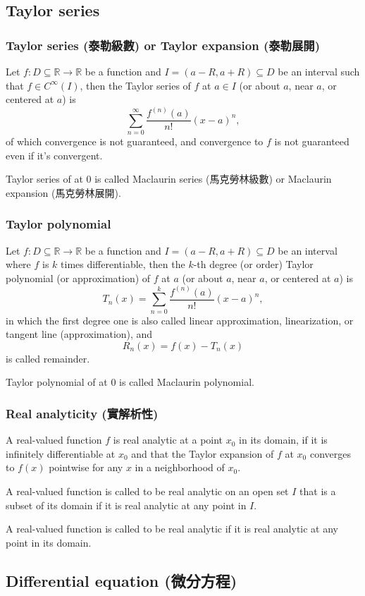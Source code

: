 \documentclass[a4paper,12pt]{report}
\begin{document}
\begin{itemize}
\begin{itemize}
\subsection{Taylor series}
\subsubsection{Taylor series (泰勒級數) or Taylor expansion (泰勒展開)}
Let $f\colon D\subseteq\mathbb{R}\to\mathbb{R}$ be a function and $I=(a-R,a+R)\subseteq D$ be an interval such that $f\in C^{\infty}(I)$, then the Taylor series of $f$ at $a\in I$ (or about $a$, near $a$, or centered at $a$) is
\[\sum_{n=0}^{\infty}\frac{f^{(n)}(a)}{n!}(x-a)^n,\]
of which convergence is not guaranteed, and convergence to $f$ is not guaranteed even if it's convergent.

Taylor series of at $0$ is called Maclaurin series (馬克勞林級數) or Maclaurin expansion (馬克勞林展開).
\subsubsection{Taylor polynomial}
Let $f\colon D\subseteq\mathbb{R}\to\mathbb{R}$ be a function and $I=(a-R,a+R)\subseteq D$ be an interval where $f$ is $k$ times differentiable, then the $k$-th degree (or order) Taylor polynomial (or approximation) of $f$ at $a$ (or about $a$, near $a$, or centered at $a$) is
\[T_n(x)=\sum_{n=0}^k\frac{f^{(n)}(a)}{n!}(x-a)^n,\]
in which the first degree one is also called linear approximation, linearization, or tangent line (approximation), and
\[R_n(x)=f(x)-T_n(x)\]
is called remainder.

Taylor polynomial of at $0$ is called Maclaurin polynomial.
\subsubsection{Real analyticity (實解析性)}
A real-valued function $f$ is real analytic at a point $x_0$ in its domain, if it is infinitely differentiable at $x_0$ and that the Taylor expansion of $f$ at $x_0$ converges to $f(x)$ pointwise for any $x$ in a neighborhood of $x_0$.

A real-valued function is called to be real analytic on an open set $I$ that is a subset of its domain if it is real analytic at any point in $I$.

A real-valued function is called to be real analytic if it is real analytic at any point in its domain.
\subsection{Differential equation (微分方程)}

\end{itemize}
\end{itemize}
\end{document}
